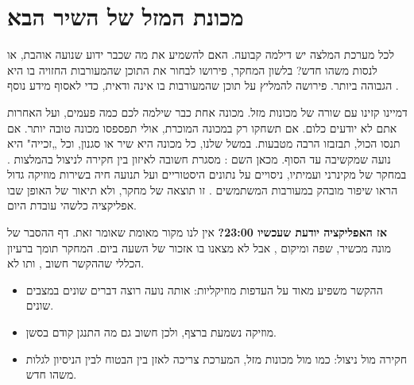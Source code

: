 \section{מכונת המזל של השיר הבא}

לכל מערכת המלצה יש דילמה קבועה. האם להשמיע את מה שכבר ידוע שנועה אוהבת, או לנסות משהו חדש? בלשון המחקר,  פירושו לבחור את התוכן שהמעורבות החזויה בו היא הגבוהה ביותר.  פירושה להמליץ על תוכן שהמעורבות בו אינה ודאית, כדי לאסוף מידע נוסף \cite{mcinerney2018explore}.

דמיינו קזינו עם שורה של מכונות מזל. מכונה אחת כבר שילמה לכם כמה פעמים, ועל האחרות אתם לא יודעים כלום. אם תשחקו רק במכונה המוכרת, אולי תפספסו מכונה טובה יותר. אם תנסו הכול, תבזבזו הרבה מטבעות. במשל שלנו, כל מכונה היא שיר או סגנון, וכל „זכייה" היא נועה שמקשיבה עד הסוף. מכאן השם : מסגרת חשובה לאיזון בין חקירה לניצול בהמלצות \cite{mcinerney2018explore}. במחקר של מקינרני ועמיתיו, ניסויים על נתונים היסטוריים ועל תנועה חיה בשירות מוזיקה גדול הראו שיפור מובהק במעורבות המשתמשים \cite{mcinerney2018explore}. זו תוצאה של מחקר, ולא תיאור של האופן שבו אפליקציה כלשהי עובדת היום.

\begin{realitycheck}
\textbf{אז האפליקציה יודעת שעכשיו 23:00?} אין לנו מקור מאומת שאומר זאת. דף ההסבר של  מונה מכשיר, שפה ומיקום \cite{spotify2026understanding}, אבל לא מצאנו בו אזכור של השעה ביום. המחקר תומך ברעיון הכללי שההקשר חשוב \cite{schedl2018current}, ותו לא.
\end{realitycheck}

\begin{inshort}
\begin{itemize}
  \item ההקשר משפיע מאוד על העדפות מוזיקליות: אותה נועה רוצה דברים שונים במצבים שונים.
  \item מוזיקה נשמעת ברצף, ולכן חשוב גם מה התנגן קודם בסשן.
  \item חקירה מול ניצול: כמו מול מכונות מזל, המערכת צריכה לאזן בין הבטוח לבין הניסיון לגלות משהו חדש.
\end{itemize}
\end{inshort}
